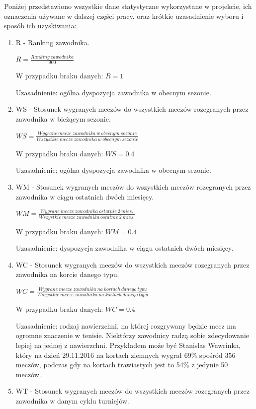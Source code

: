 Poniżej przedstawiono wszystkie dane statystyczne wykorzystane w projekcie, ich oznaczenia używane w dalszej części pracy, oraz krótkie uzasadnienie wyboru i sposób ich uzyskiwania:
\begin{enumerate}
\item R - Ranking zawodnika.

$R = \frac{Ranking\ zawodnika}{900}$

W przypadku braku danych: $R = 1$

Uzasadnienie: ogólna dyspozycja zawodnika w obecnym sezonie.

\item WS - Stosunek wygranych meczów do wszystkich meczów rozegranych przez zawodnika w bieżącym sezonie.

$WS = \frac{Wygrane\ mecze\ zawodnika\ w\ obecnym\ sezonie}{Wszystkie\ mecze\ zawodnika\ w\ obecnym\ sezonie}$

W przypadku braku danych: $WS = 0.4$

Uzasadnienie: ogólna dyspozycja zawodnika w obecnym sezonie.

\item WM - Stosunek wygranych meczów do wszystkich meczów rozegranych przez zawodnika w ciągu ostatnich dwóch miesięcy.

$WM = \frac{Wygrane\ mecze\ zawodnika\ ostatnie\ 2\ mies.}{Wszystkie\ mecze\ zawodnika\ ostatnie\ 2\ mies.}$

W przypadku braku danych: $WM = 0.4$

Uzasadnienie: dyspozycja zawodnika w ciągu ostatnich dwóch miesięcy.

\item WC - Stosunek wygranych meczów do wszystkich meczów rozegranych przez zawodnika na korcie danego typu.

$WC = \frac{Wygrane\ mecze\ zawodnika\ na\ kortach\ danego\ typu}{Wszystkie\ mecze\ zawodnika\ na\ kortach\ danego\ typu}$

W przypadku braku danych: $WC = 0.4$

Uzasadnienie: rodzaj nawierzchni, na której rozgrywany będzie mecz ma ogromne znaczenie w tenisie. Niektórzy zawodnicy radzą sobie zdecydowanie lepiej na jednej z nawierzchni. Przykładem może być Stanislas Wawrinka, który na dzień 29.11.2016 na kortach ziemnych wygrał 69\% spośród 356 meczów, podczas gdy na kortach trawiastych jest to 54\% z jedynie 50 meczów.

\item WT - Stosunek wygranych meczów do wszystkich meczów rozegranych przez zawodnika w danym cyklu turniejów.


\end{enumerate}
